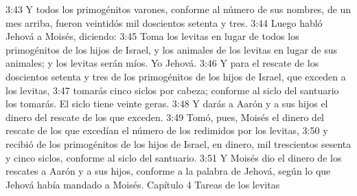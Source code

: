 3:43 Y todos los primogénitos varones, conforme al número de sus nombres, de un mes arriba, fueron veintidós mil doscientos setenta y tres.  
3:44 Luego habló Jehová a Moisés, diciendo:  
3:45 Toma los levitas en lugar de todos los primogénitos de los hijos de Israel, y los animales de los levitas en lugar de sus animales; y los levitas serán míos. Yo Jehová.  
3:46 Y para el rescate de los doscientos setenta y tres de los primogénitos de los hijos de Israel, que exceden a los levitas,  
3:47 tomarás cinco siclos   por cabeza; conforme al siclo del santuario los tomarás. El siclo tiene veinte geras.  
3:48 Y darás a Aarón y a sus hijos el dinero del rescate de los que exceden.  
3:49 Tomó, pues, Moisés el dinero del rescate de los que excedían el número de los redimidos por los levitas,  
3:50 y recibió de los primogénitos de los hijos de Israel, en dinero, mil trescientos sesenta y cinco siclos,  conforme al siclo del santuario.  
3:51 Y Moisés dio el dinero de los rescates a Aarón y a sus hijos, conforme a la palabra de Jehová, según lo que Jehová había mandado a Moisés.  
Capítulo 4 
Tareas de los levitas 

